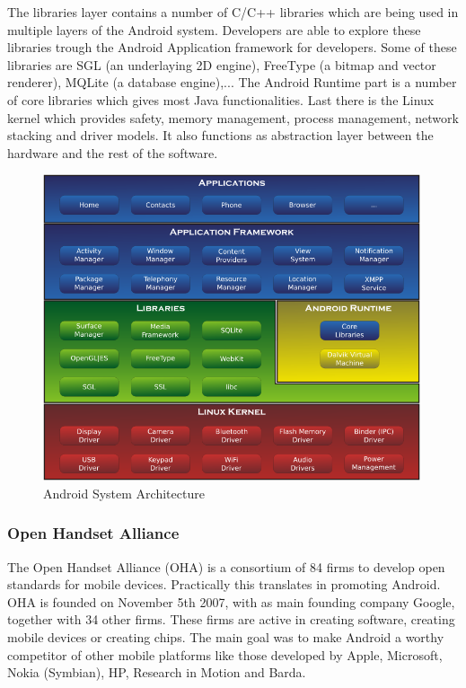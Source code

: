 \documentclass[a4paper,12pt]{report}
\begin{document}
The libraries layer contains a number of C/C++ libraries which are being used in multiple layers of the Android system. Developers are able to explore these libraries
trough the Android Application framework for developers. Some of these libraries are SGL (an underlaying 2D engine), FreeType (a bitmap and vector renderer), MQLite (a 
database engine),... The Android Runtime part is a number of core libraries which gives most Java functionalities. Last there is the Linux kernel which provides safety, memory
management, process management, network stacking and driver models. It also functions as abstraction layer between the hardware and the rest of the software.
\begin{figure}
  \centering
    \includegraphics[width=0.99\textwidth]{images/Android-System-Architecture.png}
  \caption{Android System Architecture}
\end{figure}
\subsubsection{Open Handset Alliance}
The Open Handset Alliance (OHA) is a consortium of 84 firms to develop open standards for mobile devices. Practically this translates in promoting Android. OHA is founded
on November 5th 2007, with as main founding company Google, together with 34 other firms. These firms are active in creating software, creating mobile devices or creating
chips. The main goal was to make Android a worthy competitor of other mobile platforms like those developed by Apple, Microsoft, Nokia (Symbian), HP, Research in Motion 
and Barda.
\end{document}
